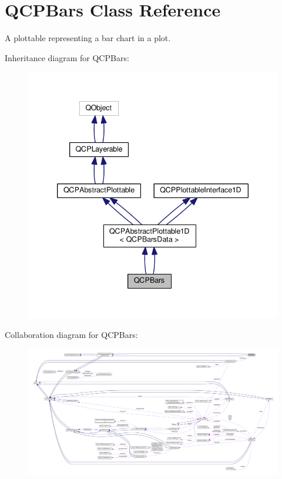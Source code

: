 \hypertarget{class_q_c_p_bars}{}\section{Q\+C\+P\+Bars Class Reference}
\label{class_q_c_p_bars}


A plottable representing a bar chart in a plot.  




Inheritance diagram for Q\+C\+P\+Bars\+:\nopagebreak
\begin{figure}[H]
\begin{center}
\leavevmode
\includegraphics[width=339pt]{class_q_c_p_bars__inherit__graph}
\end{center}
\end{figure}


Collaboration diagram for Q\+C\+P\+Bars\+:\nopagebreak
\begin{figure}[H]
\begin{center}
\leavevmode
\includegraphics[width=350pt]{class_q_c_p_bars__coll__graph}
\end{center}
\end{figure}
